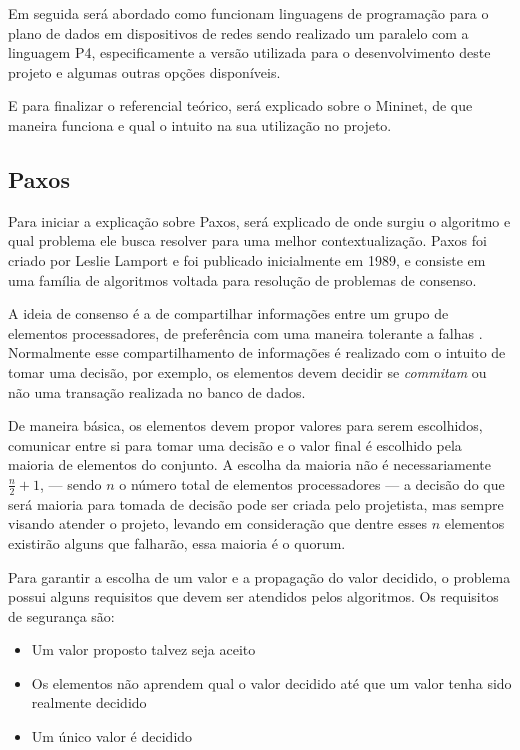 \documentclass[12pt,
openright, 
oneside,
a4paper,
brazil]{facom-ufu-abntex2}
\theoremstyle{definition}
\begin{document}
Em seguida será abordado como funcionam linguagens de programação para o plano de
dados em dispositivos de redes sendo realizado um paralelo com a linguagem P4, 
especificamente a versão utilizada para o desenvolvimento deste projeto e algumas
outras opções disponíveis.

E para finalizar o referencial teórico, será explicado sobre o Mininet, de que
maneira funciona e qual o intuito na sua utilização no projeto.

\subsection{Paxos}
Para iniciar a explicação sobre Paxos, será explicado de onde surgiu o algoritmo e qual
problema ele busca resolver para uma melhor contextualização. Paxos foi criado por 
Leslie Lamport e foi publicado inicialmente em 1989, e consiste em uma família de algoritmos
voltada para resolução de problemas de consenso. 

A ideia de consenso é a de compartilhar informações entre um grupo de elementos
processadores, de preferência com uma maneira tolerante a falhas \citep{barborak1993consensus}.
Normalmente esse compartilhamento de informações é realizado com o intuito de tomar
uma decisão, por exemplo, os elementos devem decidir se \textit{commitam} ou não
uma transação realizada no banco de dados. 

De maneira básica, os elementos devem propor valores para serem escolhidos, 
comunicar entre si para tomar uma decisão e o valor final é escolhido pela maioria de 
elementos do conjunto.
A escolha da maioria não é necessariamente $\frac{n}{2}+1$, --- sendo $n$ o número
total de elementos processadores --- a decisão do que será maioria para tomada de decisão
pode ser criada pelo projetista, mas sempre visando atender o projeto, levando
em consideração que dentre esses $n$ elementos existirão alguns que falharão, essa maioria
é o quorum.

Para garantir a escolha de um valor e a propagação do valor decidido, o problema
possui alguns requisitos que devem ser atendidos pelos algoritmos. Os requisitos de
segurança são:

\begin{itemize}
    \item Um valor proposto talvez seja aceito
    \item Os elementos não aprendem qual o valor decidido até que um valor 
    tenha sido realmente decidido
    \item Um único valor é decidido
\end{itemize}
\end{document}
